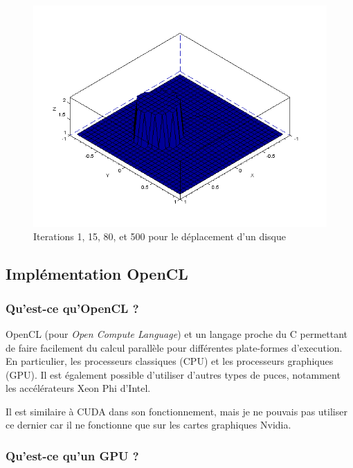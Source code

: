 \documentclass[12pt,a4paper,twoside]{article}
\begin{document}
\begin{figure}
\begin{center}
\includegraphics[scale=0.35]{Images/cercle4.png}
\caption{Iterations 1, 15, 80, et 500 pour le déplacement d'un disque}
\label{iterationsg2}
\end{center}
\end{figure}





\subsection{Implémentation OpenCL}

\subsubsection{Qu'est-ce qu'OpenCL ?}

OpenCL (pour \emph{Open Compute Language}) et un langage proche du C permettant de faire facilement du calcul parallèle pour différentes plate-formes d'execution\cite{stone2010opencl}. En particulier, les processeurs classiques (CPU) et les processeurs graphiques (GPU). Il est également possible d'utiliser d'autres types de puces, notamment les accélérateurs 
Xeon Phi d'Intel.

Il est similaire à CUDA dans son fonctionnement, mais je ne pouvais pas utiliser ce dernier car il ne fonctionne
que sur les cartes graphiques Nvidia. \\

\subsubsection{Qu'est-ce qu'un GPU ?}
\end{document}
